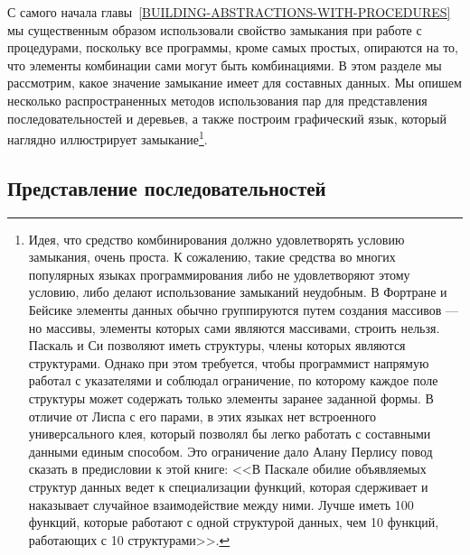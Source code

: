 С самого начала главы~\ref{BUILDING-ABSTRACTIONS-WITH-PROCEDURES} мы
существенным образом использовали свойство замыкания при работе с
процедурами, поскольку все программы, кроме самых простых, опираются
на то, что элементы комбинации сами могут быть комбинациями.  В этом
разделе мы рассмотрим, какое значение замыкание имеет для составных
данных.  Мы опишем несколько распространенных методов использования 
пар для представления последовательностей и деревьев, а также построим
графический язык, который наглядно иллюстрирует замыкание\footnote{Идея, что средство комбинирования должно удовлетворять
условию замыкания, очень проста. К сожалению, такие средства во 
многих популярных языках программирования либо не удовлетворяют этому
условию, либо делают использование замыканий неудобным.  В
Фортране и
 Бейсике элементы данных обычно группируются 
путем создания массивов 
--- но массивы, элементы которых сами являются массивами, строить
нельзя.  Паскаль и Си позволяют иметь 
структуры, члены которых являются  
структурами.  Однако при этом требуется, чтобы программист напрямую работал 
с указателями и соблюдал ограничение, по которому каждое поле структуры
может содержать только элементы заранее заданной формы.  В отличие от
Лиспа с его парами, в этих языках нет встроенного универсального клея,
который позволял бы легко работать с составными данными единым
способом.  Это ограничение дало  Алану Перлису 
повод сказать в предисловии к этой книге:
<<В Паскале обилие объявляемых структур 
данных ведет к специализации функций, которая сдерживает и наказывает
случайное взаимодействие между ними.  Лучше иметь 100 функций, которые работают с одной
структурой данных, чем 10 функций, работающих с 10
структурами>>.
}.

\subsection{Представление последовательностей}
\label{REPRESENTING-SEQUENCES}


